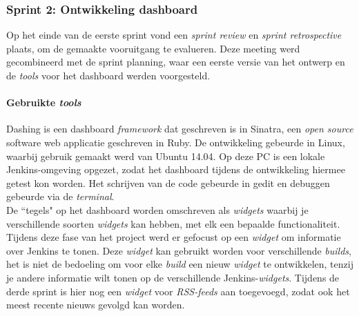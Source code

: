 \documentclass[10pt,a4paper]{article}
\begin{document}
\subsubsection{Sprint 2: Ontwikkeling dashboard} 
\label{sprint2}
Op het einde van de eerste sprint vond een \textit{sprint review} en \textit{sprint retrospective} plaats, om de gemaakte vooruitgang te evalueren. Deze meeting werd gecombineerd met de sprint planning, waar een eerste versie van het ontwerp en de \textit{tools} voor het dashboard werden voorgesteld.
\paragraph{Gebruikte \textit{tools}}
Dashing is een dashboard \textit{framework} dat geschreven is in Sinatra, een \textit{open source} software web applicatie geschreven in Ruby. De ontwikkeling gebeurde in Linux, waarbij gebruik gemaakt werd van Ubuntu 14.04. Op deze PC is een lokale Jenkins-omgeving opgezet, zodat het dashboard tijdens de ontwikkeling hiermee getest kon worden. Het schrijven van de code gebeurde in gedit en debuggen gebeurde via de \textit{terminal}.\\
De ``tegels" op het dashboard worden omschreven als \textit{widgets} waarbij je verschillende soorten \textit{widgets} kan hebben, met elk een bepaalde functionaliteit. Tijdens deze fase van het project werd er gefocust op een \textit{widget} om informatie over Jenkins te tonen. Deze \textit{widget} kan gebruikt worden voor verschillende \textit{builds}, het is niet de bedoeling om voor elke \textit{build} een nieuw \textit{widget} te ontwikkelen, tenzij je andere informatie wilt tonen op de verschillende Jenkins-\textit{widgets}. Tijdens de derde sprint is hier nog een \textit{widget} voor \textit{RSS-feeds} aan toegevoegd, zodat ook het meest recente nieuws gevolgd kan worden.
\end{document}
